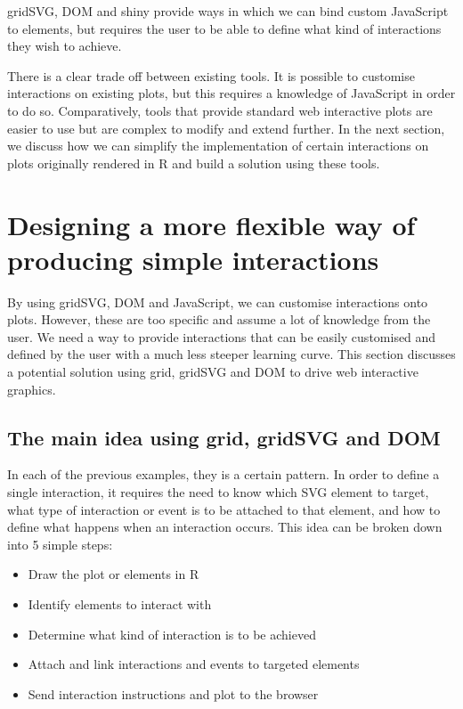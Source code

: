 \documentclass[11pt,]{report}
\providecommand{\tightlist}{%
  \setlength{\itemsep}{0pt}\setlength{\parskip}{0pt}}
\begin{document}
\textsf{gridSVG}, \textsf{DOM} and \textsf{shiny} provide ways in which
we can bind custom JavaScript to elements, but requires the user to be
able to define what kind of interactions they wish to achieve.

There is a clear trade off between existing tools. It is possible to
customise interactions on existing plots, but this requires a knowledge
of JavaScript in order to do so. Comparatively, tools that provide
standard web interactive plots are easier to use but are complex to
modify and extend further. In the next section, we discuss how we can
simplify the implementation of certain interactions on plots originally
rendered in R and build a solution using these tools.

\newpage

\chapter{Designing a more flexible way of producing simple
interactions}\label{designing-a-more-flexible-way-of-producing-simple-interactions}

By using \textsf{gridSVG}, \textsf{DOM} and JavaScript, we can customise
interactions onto plots. However, these are too specific and assume a
lot of knowledge from the user. We need a way to provide interactions
that can be easily customised and defined by the user with a much less
steeper learning curve. This section discusses a potential solution
using grid, \textsf{gridSVG} and \textsf{DOM} to drive web interactive
graphics.

\section{The main idea using grid, gridSVG and
DOM}\label{the-main-idea-using-grid-gridsvg-and-dom}

In each of the previous examples, they is a certain pattern. In order to
define a single interaction, it requires the need to know which SVG
element to target, what type of interaction or event is to be attached
to that element, and how to define what happens when an interaction
occurs. This idea can be broken down into 5 simple steps:

\begin{itemize}
\tightlist
\item
  Draw the plot or elements in R
\item
  Identify elements to interact with
\item
  Determine what kind of interaction is to be achieved
\item
  Attach and link interactions and events to targeted elements
\item
  Send interaction instructions and plot to the browser
\end{itemize}
\end{document}
